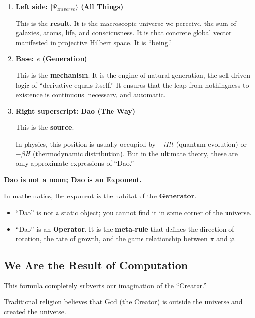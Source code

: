 \begin{enumerate}
\item \textbf{Left side: $|\Psi_{universe}\rangle$ (All Things)}

    This is the \textbf{result}. It is the macroscopic universe we perceive, the sum of galaxies, atoms, life, and consciousness. It is that concrete global vector manifested in projective Hilbert space. It is ``being.''

\item \textbf{Base: $e$ (Generation)}

    This is the \textbf{mechanism}. It is the engine of natural generation, the self-driven logic of ``derivative equals itself.'' It ensures that the leap from nothingness to existence is continuous, necessary, and automatic.

\item \textbf{Right superscript: Dao (The Way)}

    This is the \textbf{source}.

    In physics, this position is usually occupied by $-iHt$ (quantum evolution) or $-\beta H$ (thermodynamic distribution). But in the ultimate theory, these are only approximate expressions of ``Dao.''
\end{enumerate}

\textbf{Dao is not a noun; Dao is an Exponent.}

In mathematics, the exponent is the habitat of the \textbf{Generator}.

\begin{itemize}
\item ``Dao'' is not a static object; you cannot find it in some corner of the universe.

\item ``Dao'' is an \textbf{Operator}. It is the \textbf{meta-rule} that defines the direction of rotation, the rate of growth, and the game relationship between $\pi$ and $\varphi$.
\end{itemize}

\subsection{We Are the Result of Computation}

This formula completely subverts our imagination of the ``Creator.''

Traditional religion believes that God (the Creator) is outside the universe and created the universe.

